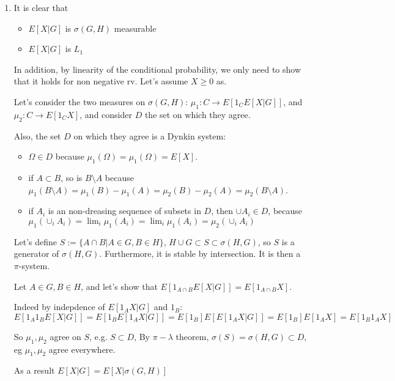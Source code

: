\documentclass[12pt]{article}
\begin{document}
\begin{enumerate}
\item It is clear that
  \begin{itemize}
  \item $E[X|G]$ is $\sigma(G, H)$ measurable
  \item $E[X|G]$ is $L_1$
  \end{itemize}
  In addition, by linearity of the conditional probability, we only need to show that it holds for non negative rv. Let's assume $X \ge 0$ as. 

  Let's consider the two measures on $\sigma(G, H)$: 
$\mu_1: C \rightarrow E[ 1_C E[X|G]]$, and $\mu_2: C  \rightarrow E[ 1_C X]$, and consider $D$ the set on which they agree.

  Also, the set $D$ on which they agree is a Dynkin system:
  \begin{itemize}
  \item $\Omega \in D$ because $\mu_1(\Omega) = \mu_1(\Omega) = E[X]$.
  \item if $A \subset B$, so is $B\setminus A$ because$\mu_1(B \setminus A) = \mu_1(B) - \mu_1(A) = \mu_2(B) - \mu_2(A) = \mu_2(B \setminus A)$.
  \item  if $A_i$ is an non-dreasing sequence of subsets in $D$, then $\cup A_i \in D$, because
    $\mu_1( \cup_i A_i) = \lim_i \mu_1(A_i) = \lim_i \mu_1(A_i) = \mu_2( \cup_i A_i)$
  \end{itemize}

  
    Let's define $S := \{ A \cap B | A \in G, B \in H \}$,
  $H \cup G \subset S \subset \sigma(H,G)$, so $S$ is a generator of $\sigma(H,G)$. Furthermore, it is stable by intersection. It is then a $\pi$-system.

    Let $A \in G, B \in H$, and let's show that $E[ 1_{A \cap B} E[X|G]] = E[1_{A \cap B} X]$.

  Indeed by indepdence of $E[1_AX|G]$ and $1_B$:
  $E[ 1_A 1_B E[X|G]] = E[1_B E[1_A X | G]] = E[1_B] E[ E[1_AX|G] ] = E[1_B] E[1_AX] = E[1_B 1_AX]$


  So $\mu_1, \mu_2$  agree on $S$, e.g. $S \subset D$, 
  By $\pi-\lambda$ theorem, $\sigma(S) = \sigma(H, G) \subset D$, eg $\mu_1, \mu_2$ agree everywhere.
  
  As a result $E[X|G] = E[X | \sigma(G,H)]$
  

\end{enumerate}
\end{document}
